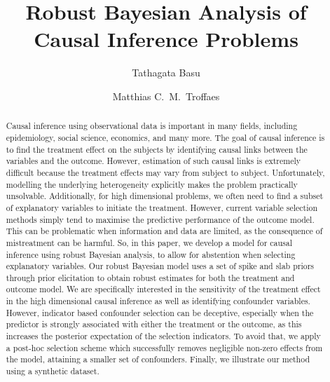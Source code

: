 \documentclass[preprint,12pt]{elsarticle}
\begin{document}
\begin{frontmatter}

\title{Robust Bayesian Analysis of Causal Inference Problems}
\author[1]{Tathagata Basu}
\author[2]{Matthias C.~M.~Troffaes}

\begin{abstract}
Causal inference using observational data is important in
many fields, including epidemiology, social science, economics, and many more.
The goal of causal inference is to find the treatment effect on the subjects
by identifying causal links between the variables and the outcome.
However, estimation of such causal links is extremely 
difficult because the treatment effects may vary from subject 
to subject. Unfortunately, modelling the underlying heterogeneity explicitly makes the 
problem practically unsolvable. Additionally, for high dimensional problems,
we often need to find a subset of 
explanatory variables to initiate the treatment. However, current variable selection methods
simply tend to maximise the predictive performance of the outcome model. This can be problematic when information and data are limited,
as the consequence of mistreatment can be harmful. 
So, in this paper, we develop a model for causal inference using
robust Bayesian analysis, to allow for abstention when selecting
explanatory variables.
Our robust Bayesian model uses a set of spike and slab priors 
through prior elicitation to obtain robust estimates for
both the treatment and outcome model. We are specifically interested 
in the sensitivity of the treatment effect in the high dimensional causal inference
as well as identifying confounder variables. However, indicator
based confounder selection can be deceptive, especially
when the predictor is strongly associated with either the treatment or 
the outcome, as this increases the posterior expectation of the selection
indicators. To avoid that, we apply a post-hoc selection scheme
which successfully removes negligible non-zero effects from the model,
attaining a smaller set of confounders. Finally, we illustrate
our method using a synthetic dataset.
\end{abstract}


\end{frontmatter}
\end{document}
